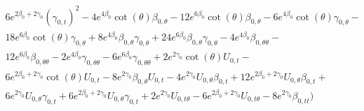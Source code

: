 \documentclass[a4paper,11pt]{article}
\numberwithin{equation}{section}
\begin{document}
\begin{subequations}
\begin{align}
\begin{split}
&6 e^{2\beta_{0}+2 \gamma_{0}} (\gamma_{0, t})^2-4 e^{4\beta_{0}} \cot (\theta )\beta_{0, \theta}-12 e^{6\beta_{0}} \cot (\theta )\beta_{0, \theta}-6 e^{4\beta_{0}} \cot (\theta ) \gamma_{0, \theta}-\\
&18 e^{6\beta_{0}} \cot (\theta ) \gamma_{0, \theta}+8 e^{4\beta_{0}}\beta_{0, \theta} \gamma_{0, \theta}+24 e^{6\beta_{0}}\beta_{0, \theta} \gamma_{0, \theta}-4 e^{4\beta_{0}}\beta_{0, \theta \theta}-\\
&12 e^{6\beta_{0}}\beta_{0, \theta \theta}-2 e^{4\beta_{0}} \gamma_{0, \theta \theta}-6 e^{6\beta_{0}} \gamma_{0, \theta \theta}+2 e^{2 \gamma_{0}} \cot (\theta ) U_{0, t}-\\
&6 e^{2\beta_{0}+2 \gamma_{0}} \cot (\theta ) U_{0, t}-8 e^{2 \gamma_{0}}\beta_{0, \theta} U_{0, t}-4 e^{2 \gamma_{0}} U_{0, \theta}\beta_{0, t}+12 e^{2\beta_{0}+2 \gamma_{0}} U_{0, \theta}\beta_{0, t}+\\
&6 e^{2 \gamma_{0}} U_{0, \theta} \gamma_{0, t}+6 e^{2\beta_{0}+2 \gamma_{0}} U_{0, \theta} \gamma_{0, t}+2 e^{2 \gamma_{0}} U_{0, t \theta}-6 e^{2\beta_{0}+2 \gamma_{0}} U_{0, t \theta}-8 e^{2 \gamma_{0}}\beta_{0, t t})
\end{split}
\end{align}


\end{subequations}
\end{document}
